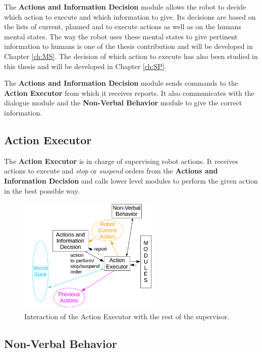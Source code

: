 \documentclass[english,a4paper,11pt,twoside]{StyleThese}
\begin{document}
The \textbf{Actions and Information Decision} module allows the robot to decide which action to execute and which information to give. Its decisions are based on the lists of current, planned and to execute actions as well as on the humans mental states. The way the robot uses these mental states to give pertinent information to humans is one of the thesis contribution and will be developed in Chapter \ref{ch:MS}. The decision of which action to execute has also been studied in this thesis and will be developed in Chapter \ref{ch:SP}.


The \textbf{Actions and Information Decision} module sends commands to the \textbf{Action Executor} from which it receives reports. It also communicates with the dialogue module and the \textbf{Non-Verbal Behavior} module to give the correct information.

\subsection{Action Executor}

The \textbf{Action Executor} is in charge of supervising robot actions. It receives actions to execute and \textit{stop} or \textit{suspend} orders from the \textbf{Actions and Information Decision} and calls lower level modules to perform the given action in the best possible way.

\begin{figure}[!h]
	\centering
    \includegraphics[width=0.6\textwidth]{figs/Chapter2/ActionExecutor.png}
    \caption{Interaction of the Action Executor with the rest of the supervisor.}
    \label{fig:actionExecutor}
\end{figure}


\subsection{Non-Verbal Behavior}
\end{document}
